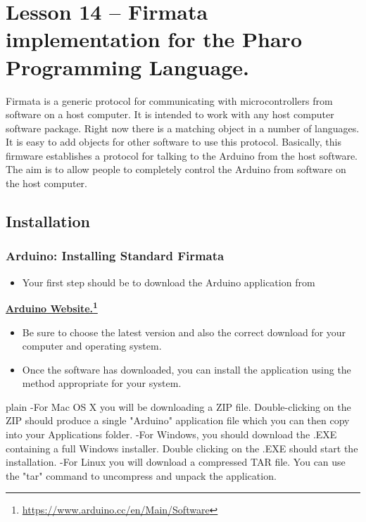 \documentclass[10pt,twoside,english]{_support/latex/sbabook/sbabook}
\begin{document}
\frontmatter
\pagestyle{plain}

\tableofcontents*
\clearpage\listoffigures

\mainmatter

\chapter{Lesson 14 –  Firmata implementation for the Pharo Programming Language.}
Firmata is a generic protocol for communicating with microcontrollers from software on a host computer. 
It is intended to work with any host computer software package. Right now there is a matching object in a number of languages. 
It is easy to add objects for other software to use this protocol. 
Basically, this firmware establishes a protocol for talking to the Arduino from the host software. 
The aim is to allow people to completely control the Arduino from software on the host computer.
\section{Installation}\subsection{Arduino: Installing Standard Firmata}
\begin{itemize}
\item Your first step should be to download the Arduino application from 
\end{itemize}

\textbf{\href{https://www.arduino.cc/en/Main/Software}{Arduino Website.}\footnote{\url{https://www.arduino.cc/en/Main/Software}}} 

\begin{itemize}
\item Be sure to choose the latest version and also the correct download for your computer and operating system.
\item Once the software has downloaded, you can install the application using the method appropriate for your system. 
\end{itemize}

\begin{displaycode}{plain}
  -For Mac OS X you will be downloading a ZIP file. Double-clicking on the ZIP should produce a single "Arduino" application file which you can then copy into your Applications folder.
  -For Windows, you should download the .EXE containing a full Windows installer. Double clicking on the .EXE should start the installation.
  -For Linux you will download a compressed TAR file. You can use the "tar" command to uncompress and unpack the application.
\end{displaycode}
\end{document}
